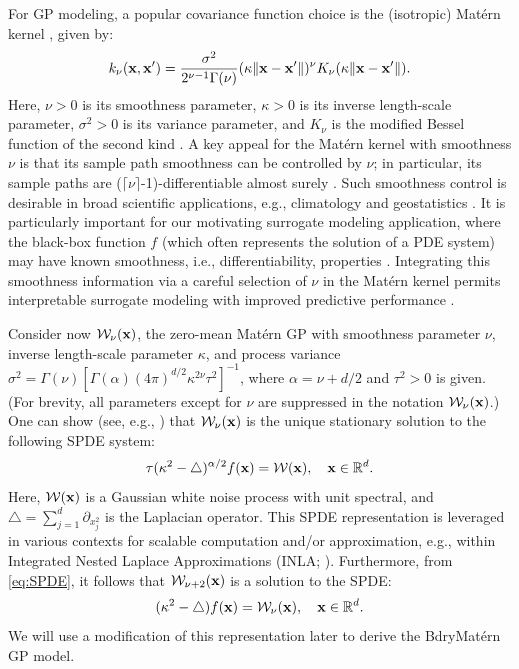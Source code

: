 \documentclass[aos,preprint]{imsart}
\theoremstyle{plain}
\newcommand{\Real}{\mathbb R}
\newcommand{\Bx}{\bold x}
\newcommand{\BFx}{\bold x}
\newcommand{\CalW}{\mathcal{W}}
\theoremstyle{remark}
\begin{document}
For GP modeling, a popular covariance function choice is the (isotropic) Mat\'ern kernel \citep{stein1999}, given by:
\begin{equation}
    \label{eq:matern}
    k_{\nu}(\BFx,\BFx')=\frac{\sigma^2}{2^{\nu-1}\Gamma(\nu)}(\kappa\|\BFx-\BFx'\|)^\nu K_\nu(\kappa\|\BFx-\BFx'\|).
\end{equation}
Here, $\nu > 0$ is its smoothness parameter, $\kappa >0$ is its inverse length-scale parameter, $\sigma^2 > 0$ is its variance parameter, and $K_\nu$ is the modified Bessel function of the second kind \citep{abramowitz1965handbook}. A key appeal for the Mat\'ern kernel with smoothness $\nu$ is that its sample path smoothness can be controlled by $\nu$; in particular, its sample paths are \textup{($\lceil\nu\rceil$-1)}-differentiable almost surely \citep{da2023sample}. Such smoothness control is desirable in broad scientific applications, e.g., climatology \citep{wiens2020modeling} and geostatistics \citep{pardo2008geostatistics}. It is particularly important for our motivating surrogate modeling application, where the black-box function $f$ (which often represents the solution of a PDE system) may have known smoothness, i.e., differentiability, properties \citep{Evans15}. Integrating this smoothness information via a careful selection of $\nu$ in the Mat\'ern kernel permits interpretable surrogate modeling with improved predictive performance \citep{stein1999}.


Consider now $\mathcal{W}_{\nu}(\Bx)$, the zero-mean Mat\'ern GP with smoothness parameter $\nu$, inverse length-scale parameter $\kappa$, and process variance $\sigma^2 = \Gamma(\nu)[\Gamma(\alpha)(4\pi)^{d/2}\kappa^{2\nu}\tau^2]^{-1}$, where $\alpha=\nu+d/2$ and $\tau^2 > 0$ is given. (For brevity, all parameters except for $\nu$ are suppressed in the notation $\mathcal{W}_{\nu}(\Bx)$.) One can show (see, e.g., \cite{whittle1954stationary,whittle1963stochastic,LindgrenRueLindstrom11}) that $\mathcal{W}_{\nu}(\Bx)$ is the unique stationary solution to the following SPDE system:
\begin{equation}
    \label{eq:SPDE}
    \tau (\kappa^2-\bigtriangleup)^{\alpha/2}f(\BFx)=\mathcal{W}(\Bx),\quad \BFx\in\Real^d.
\end{equation}
Here, $\CalW(\Bx)$ is a Gaussian white noise process with unit spectral, and $\bigtriangleup=\sum_{j=1}^d\partial_{x_j^2}$ is the Laplacian operator. This SPDE representation is leveraged in various contexts for scalable computation and/or approximation, e.g., within Integrated Nested Laplace Approximations (INLA; \cite{rue2009approximate}). Furthermore, from \eqref{eq:SPDE}, it follows that $\mathcal{W}_{\nu+2}(\Bx)$ is a solution to the SPDE:
\begin{equation}
    (\kappa^2-\bigtriangleup)f(\BFx)=\mathcal{W}_\nu(\Bx),\quad \BFx\in\Real^d.
    \label{eq:SPDE2}
\end{equation}
We will use a modification of this representation later to derive the BdryMat\'ern GP model.
\end{document}
